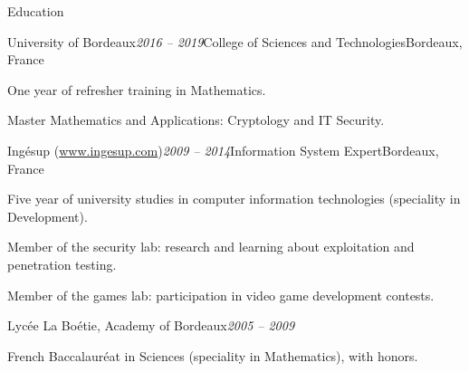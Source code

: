 \begin{rSection}{Education}

  \begin{rSubsection}{University of Bordeaux}{\em 2016 -- 2019}{College of Sciences and Technologies}{Bordeaux, France}
    \item One year of refresher training in Mathematics.
    \item Master Mathematics and Applications: Cryptology and IT Security.
  \end{rSubsection}

  \begin{rSubsection}{Ingésup (\href{www.ingesup.com}{www.ingesup.com})}{\em 2009 -- 2014}{Information System Expert}{Bordeaux, France}
    \item[] Five year of university studies in computer information technologies (speciality in Development).
    \item Member of the security lab: research and learning about exploitation and penetration testing.
    \item Member of the games lab: participation in video game development contests.
  \end{rSubsection}

  \begin{rSubsection}{Lycée La Boétie, Academy of Bordeaux}{\em 2005 -- 2009}{}{}
    \item[] French Baccalauréat in Sciences (speciality in Mathematics), with honors.
  \end{rSubsection}

\end{rSection}
